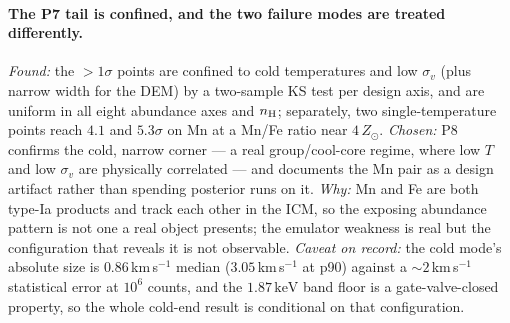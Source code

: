 \documentclass[11pt]{article}
\newcommand{\kev}{\,\mathrm{keV}}
\begin{document}
\paragraph{The P7 tail is confined, and the two failure modes are treated
differently.} \emph{Found:} the $>1\sigma$ points are confined to cold
temperatures and low $\sigma_v$ (plus narrow width for the DEM) by a
two-sample KS test per design axis, and are uniform in all eight abundance axes
and $n_{\rm H}$; separately, two single-temperature points reach $4.1$ and
$5.3\sigma$ on Mn at a Mn/Fe ratio near $4\,Z_\odot$. \emph{Chosen:} P8 confirms
the cold, narrow corner --- a real group/cool-core regime, where low $T$ and
low $\sigma_v$ are physically correlated --- and documents the Mn pair as a
design artifact rather than spending posterior runs on it. \emph{Why:} Mn and
Fe are both type-Ia products and track each other in the ICM, so the exposing
abundance pattern is not one a real object presents; the emulator weakness is
real but the configuration that reveals it is not observable. \emph{Caveat on
record:} the cold mode's absolute size is $0.86$\,km\,s$^{-1}$ median
($3.05$\,km\,s$^{-1}$ at p90) against a ${\sim}2$\,km\,s$^{-1}$ statistical error at $10^{6}$
counts, and the $1.87\kev$ band floor is a gate-valve-closed property, so the
whole cold-end result is conditional on that configuration.
\end{document}

